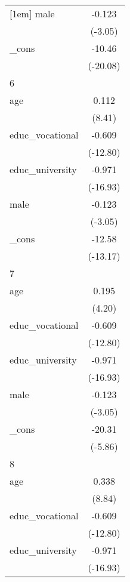 {\begin{tabular}{l*{1}{c}}
[1em]
male        &      -0.123\sym{**} \\
            &     (-3.05)         \\
[1em]
\_cons      &      -10.46\sym{***}\\
            &    (-20.08)         \\
\hline
6           &                     \\
age         &       0.112\sym{***}\\
            &      (8.41)         \\
[1em]
educ\_vocational&      -0.609\sym{***}\\
            &    (-12.80)         \\
[1em]
educ\_university&      -0.971\sym{***}\\
            &    (-16.93)         \\
[1em]
male        &      -0.123\sym{**} \\
            &     (-3.05)         \\
[1em]
\_cons      &      -12.58\sym{***}\\
            &    (-13.17)         \\
\hline
7           &                     \\
age         &       0.195\sym{***}\\
            &      (4.20)         \\
[1em]
educ\_vocational&      -0.609\sym{***}\\
            &    (-12.80)         \\
[1em]
educ\_university&      -0.971\sym{***}\\
            &    (-16.93)         \\
[1em]
male        &      -0.123\sym{**} \\
            &     (-3.05)         \\
[1em]
\_cons      &      -20.31\sym{***}\\
            &     (-5.86)         \\
\hline
8           &                     \\
age         &       0.338\sym{***}\\
            &      (8.84)         \\
[1em]
educ\_vocational&      -0.609\sym{***}\\
            &    (-12.80)         \\
[1em]
educ\_university&      -0.971\sym{***}\\
            &    (-16.93)         \\

\end{tabular}}
